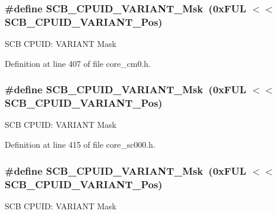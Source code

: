 \subsubsection[{\texorpdfstring{S\+C\+B\+\_\+\+C\+P\+U\+I\+D\+\_\+\+V\+A\+R\+I\+A\+N\+T\+\_\+\+Msk}{SCB_CPUID_VARIANT_Msk}}]{\setlength{\rightskip}{0pt plus 5cm}\#define S\+C\+B\+\_\+\+C\+P\+U\+I\+D\+\_\+\+V\+A\+R\+I\+A\+N\+T\+\_\+\+Msk~(0x\+F\+U\+L $<$$<$ S\+C\+B\+\_\+\+C\+P\+U\+I\+D\+\_\+\+V\+A\+R\+I\+A\+N\+T\+\_\+\+Pos)}\hypertarget{group___c_m_s_i_s___s_c_b_gad358dfbd04300afc1824329d128b99e8}{}\label{group___c_m_s_i_s___s_c_b_gad358dfbd04300afc1824329d128b99e8}
S\+CB C\+P\+U\+ID\+: V\+A\+R\+I\+A\+NT Mask 

Definition at line 407 of file core\+\_\+cm0.\+h.

\subsubsection[{\texorpdfstring{S\+C\+B\+\_\+\+C\+P\+U\+I\+D\+\_\+\+V\+A\+R\+I\+A\+N\+T\+\_\+\+Msk}{SCB_CPUID_VARIANT_Msk}}]{\setlength{\rightskip}{0pt plus 5cm}\#define S\+C\+B\+\_\+\+C\+P\+U\+I\+D\+\_\+\+V\+A\+R\+I\+A\+N\+T\+\_\+\+Msk~(0x\+F\+U\+L $<$$<$ S\+C\+B\+\_\+\+C\+P\+U\+I\+D\+\_\+\+V\+A\+R\+I\+A\+N\+T\+\_\+\+Pos)}\hypertarget{group___c_m_s_i_s___s_c_b_gad358dfbd04300afc1824329d128b99e8}{}\label{group___c_m_s_i_s___s_c_b_gad358dfbd04300afc1824329d128b99e8}
S\+CB C\+P\+U\+ID\+: V\+A\+R\+I\+A\+NT Mask 

Definition at line 415 of file core\+\_\+sc000.\+h.

\subsubsection[{\texorpdfstring{S\+C\+B\+\_\+\+C\+P\+U\+I\+D\+\_\+\+V\+A\+R\+I\+A\+N\+T\+\_\+\+Msk}{SCB_CPUID_VARIANT_Msk}}]{\setlength{\rightskip}{0pt plus 5cm}\#define S\+C\+B\+\_\+\+C\+P\+U\+I\+D\+\_\+\+V\+A\+R\+I\+A\+N\+T\+\_\+\+Msk~(0x\+F\+U\+L $<$$<$ S\+C\+B\+\_\+\+C\+P\+U\+I\+D\+\_\+\+V\+A\+R\+I\+A\+N\+T\+\_\+\+Pos)}\hypertarget{group___c_m_s_i_s___s_c_b_gad358dfbd04300afc1824329d128b99e8}{}\label{group___c_m_s_i_s___s_c_b_gad358dfbd04300afc1824329d128b99e8}
S\+CB C\+P\+U\+ID\+: V\+A\+R\+I\+A\+NT Mask 

